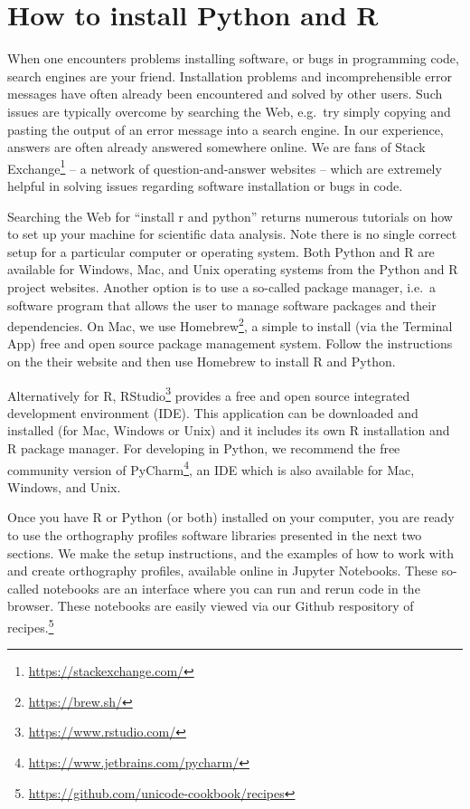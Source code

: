 \section{How to install Python and R}
When one encounters problems installing software, or bugs in programming code, search engines are your friend. Installation problems and incomprehensible error messages have often already been encountered and solved by other users. Such issues are typically overcome by searching the Web, e.g.\ try simply copying and pasting the output of an error message into a search engine. In our experience, answers are often already answered somewhere online. We are fans of Stack Exchange\footnote{\url{https://stackexchange.com/}} -- a network of question-and-answer websites -- which are extremely helpful in solving issues regarding software installation or bugs in code.

Searching the Web for ``install r and python'' returns numerous tutorials on how to set up your machine for scientific data analysis. Note there is no single correct setup for a particular computer or operating system. Both Python and R are available for Windows, Mac, and Unix operating systems from the Python and R project websites. Another option is to use a so-called package manager, i.e.\ a software program that allows the user to manage software packages and their dependencies. On Mac, we use Homebrew\footnote{\url{https://brew.sh/}}, a simple to install (via the Terminal App) free and open source package management system. Follow the instructions on the their website and then use Homebrew to install R and Python. 

Alternatively for R, RStudio\footnote{\url{https://www.rstudio.com/}} provides a free and open source integrated development environment (IDE). This application can be downloaded and installed (for Mac, Windows or Unix) and it includes its own R installation and R package manager. For developing in Python, we recommend the free community version of PyCharm\footnote{\url{https://www.jetbrains.com/pycharm/}}, an IDE which is also available for Mac, Windows, and Unix. 

Once you have R or Python (or both) installed on your computer, you are ready to use the orthography profiles software libraries presented in the next two sections. We make the setup instructions, and the examples of how to work with and create orthography profiles, available online in Jupyter Notebooks. These so-called notebooks are an interface where you can run and rerun code in the browser. These notebooks are easily viewed via our Github respository of recipes.\footnote{\url{https://github.com/unicode-cookbook/recipes}} 

